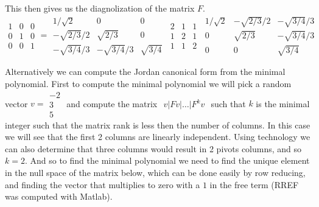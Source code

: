 \documentclass[12pt]{amsart}
\theoremstyle{definition}
\begin{document}
\begin{enumerate}
This then gives us the diagnolization of the matrix $F$.
$$\boxed{\begin{matrix}
    1 & 0 & 0\\
    0 & 1 & 0\\
    0 & 0 & 1
\end{matrix}}=\boxed{\begin{matrix}
    1/\sqrt{2} & 0 & 0\\
    -\sqrt{2/3}/2 & \sqrt{2/3} & 0\\
    -\sqrt{3/4}/3 & -\sqrt{3/4}/3 & \sqrt{3/4}
\end{matrix}}\,\boxed{\begin{matrix}
    2 & 1 & 1\\
    1 & 2 & 1\\
    1 & 1 & 2
\end{matrix}}\,\boxed{\begin{matrix}
    1/\sqrt{2} & -\sqrt{2/3}/2 & -\sqrt{3/4}/3\\
    0 & \sqrt{2/3} & -\sqrt{3/4}/3\\
    0 & 0 & \sqrt{3/4}
\end{matrix}} $$ 

Alternatively we can compute the Jordan canonical form from the minimal polynomial. First to compute the minimal polynomial we will pick a random vector $v=\boxed{\begin{matrix}
    -2 \\
    3\\
    5
\end{matrix}}$ and compute the matrix $\boxed{\begin{matrix} v|Fv|\dots|F^k v
\end{matrix}}$ such that $k$ is the minimal integer such that the matrix rank is less then the number of columns. In this case we will see that the first 2 columns are linearly independent. Using technology we can also determine that three columns would result in 2 pivots columns, and so $k=2$. And so to find the minimal polynomial we need to find the unique element in the null space of the matrix below, which can be done easily by row reducing, and finding the vector that multiplies to zero with a $1$ in the free term (RREF was computed with Matlab).


\end{enumerate}
\end{document}

